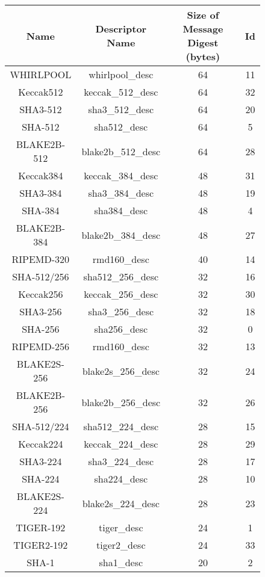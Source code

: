 \documentclass[synpaper]{book}
\begin{document}
\begin{figure}[H]
\begin{center}
\begin{tabular}{|c|c|c|c|}
      \hline \textbf{Name} & \textbf{Descriptor Name} & \textbf{Size of Message Digest (bytes)} & \textbf{Id} \\
      \hline WHIRLPOOL & whirlpool\_desc & 64 & 11 \\
      \hline Keccak512 & keccak\_512\_desc & 64 & 32 \\
      \hline SHA3-512 & sha3\_512\_desc & 64 & 20 \\
      \hline SHA-512 & sha512\_desc & 64 & 5 \\
      \hline BLAKE2B-512 & blake2b\_512\_desc & 64 & 28 \\
      \hline Keccak384 & keccak\_384\_desc & 48 & 31 \\
      \hline SHA3-384 & sha3\_384\_desc & 48 & 19 \\
      \hline SHA-384 & sha384\_desc & 48 & 4 \\
      \hline BLAKE2B-384 & blake2b\_384\_desc & 48 & 27 \\
      \hline RIPEMD-320 & rmd160\_desc & 40 & 14 \\
      \hline SHA-512/256 & sha512\_256\_desc & 32 & 16 \\
      \hline Keccak256 & keccak\_256\_desc & 32 & 30 \\
      \hline SHA3-256 & sha3\_256\_desc & 32 & 18 \\
      \hline SHA-256 & sha256\_desc & 32 & 0 \\
      \hline RIPEMD-256 & rmd160\_desc & 32 & 13 \\
      \hline BLAKE2S-256 & blake2s\_256\_desc & 32 & 24 \\
      \hline BLAKE2B-256 & blake2b\_256\_desc & 32 & 26 \\
      \hline SHA-512/224 & sha512\_224\_desc & 28 & 15 \\
      \hline Keccak224 & keccak\_224\_desc & 28 & 29 \\
      \hline SHA3-224 & sha3\_224\_desc & 28 & 17 \\
      \hline SHA-224 & sha224\_desc & 28 & 10 \\
      \hline BLAKE2S-224 & blake2s\_224\_desc & 28 & 23 \\
      \hline TIGER-192 & tiger\_desc & 24 & 1 \\
      \hline TIGER2-192 & tiger2\_desc & 24 & 33 \\
      \hline SHA-1 & sha1\_desc & 20 & 2 \\

\end{tabular}
\end{center}
\end{figure}
\end{document}
